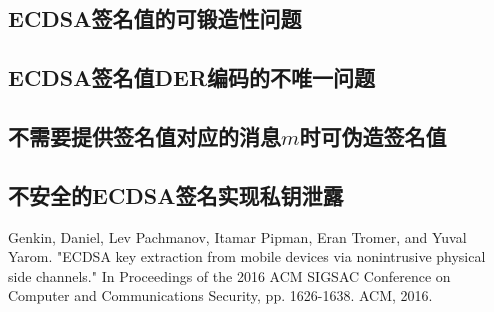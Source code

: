\documentclass{article}
\begin{document}
\subsection{ECDSA签名值的可锻造性问题}



\subsection{ECDSA签名值DER编码的不唯一问题}

\subsection{不需要提供签名值对应的消息$m$时可伪造签名值}

\subsection{不安全的ECDSA签名实现私钥泄露}


\begin{thebibliography}{99}

Genkin, Daniel, Lev Pachmanov, Itamar Pipman, Eran Tromer, and Yuval Yarom. "ECDSA key extraction from mobile devices via nonintrusive physical side channels." In Proceedings of the 2016 ACM SIGSAC Conference on Computer and Communications Security, pp. 1626-1638. ACM, 2016.

\end{thebibliography}
\end{document}
